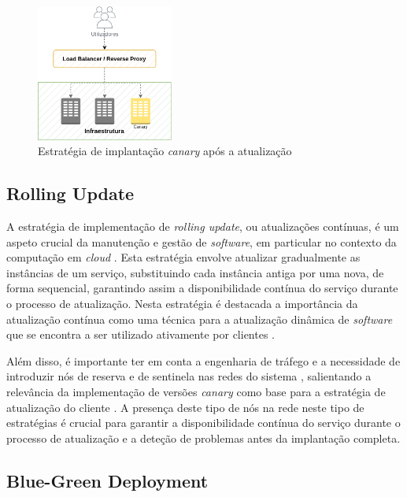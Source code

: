 \begin{figure}[H]
    \centering
    \includegraphics[width=0.4\textwidth]{media/content/estado-arte/canary-after.png}
    \caption{Estratégia de implantação \textit{canary} após a atualização}
    \label{fig:canary-after}
\end{figure}

\subsection{Rolling Update}

A estratégia de implementação de \textit{rolling update}, ou atualizações contínuas, é um aspeto 
crucial da manutenção e gestão de \textit{software}, em particular no contexto da computação em 
\textit{cloud} \cite{rolling2014}. Esta estratégia envolve atualizar gradualmente as instâncias de 
um serviço, substituindo cada instância antiga por uma nova, de forma sequencial, garantindo assim 
a disponibilidade contínua do serviço durante o processo de atualização. Nesta estratégia é destacada 
a importância da atualização contínua como uma técnica para a atualização dinâmica de \textit{software} 
que se encontra a ser utilizado ativamente por clientes \cite{rolling2014}. 

Além disso, é importante ter em conta a engenharia de tráfego e a necessidade de introduzir nós de 
reserva e de sentinela nas redes do sistema \cite{canary2022}, salientando a relevância da 
implementação de versões \textit{canary} como base para a estratégia de atualização do cliente 
\cite{canary2022}. A presença deste tipo de nós na rede neste tipo de estratégias é crucial para
garantir a disponibilidade contínua do serviço durante o processo de atualização e a deteção de
problemas antes da implantação completa.

\subsection{Blue-Green Deployment}

